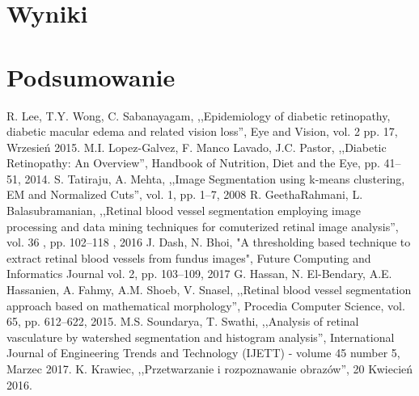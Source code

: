 \documentclass[conference]{IEEEtran}
\begin{document}
\section{Wyniki}

\section{Podsumowanie}

\begin{thebibliography}{00}
 R. Lee, T.Y. Wong, C. Sabanayagam, ,,Epidemiology of diabetic retinopathy, diabetic macular edema and related vision loss'', Eye and Vision, vol. 2 pp. 17, Wrzesień 2015.
 M.I. Lopez-Galvez, F. Manco Lavado, J.C. Pastor, ,,Diabetic Retinopathy: An Overview'', Handbook of Nutrition, Diet and the Eye, pp. 41--51, 2014.
 S. Tatiraju, A. Mehta, ,,Image Segmentation using k-means clustering, EM and Normalized Cuts'', vol. 1, pp. 1--7, 2008
 R. GeethaRahmani, L. Balasubramanian, ,,Retinal blood vessel segmentation employing image processing and data mining techniques for comuterized retinal image analysis'', vol. 36 , pp. 102--118 , 2016
 J. Dash, N. Bhoi, "A thresholding based technique to extract retinal blood vessels from fundus images", Future Computing and Informatics Journal vol. 2, pp. 103--109, 2017 
 G. Hassan, N. El-Bendary, A.E. Hassanien, A. Fahmy, A.M. Shoeb, V. Snasel, ,,Retinal blood vessel segmentation approach based on mathematical morphology'', Procedia Computer Science, vol. 65, pp. 612--622, 2015.
 M.S. Soundarya, T. Swathi, ,,Analysis of retinal vasculature by watershed segmentation and histogram analysis'', International Journal of Engineering Trends and Technology (IJETT) - volume 45 number 5, Marzec 2017.
 K. Krawiec, ,,Przetwarzanie i rozpoznawanie obrazów'', 20 Kwiecień 2016.

\end{thebibliography}
\end{document}
